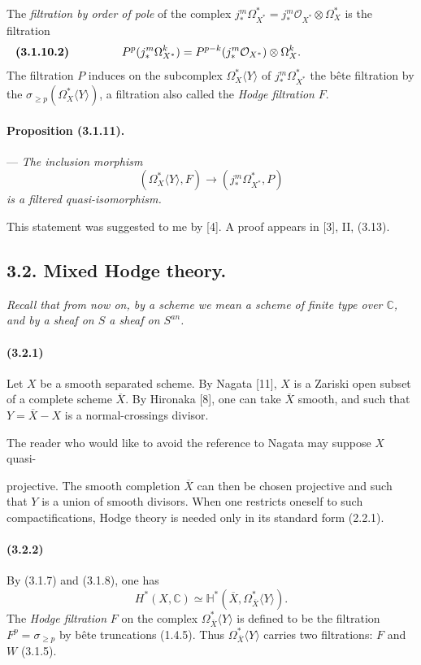 \documentclass[10pt]{article}
\newcommand{\C}{\mathbb C}
\providecommand{\cO}{\mathcal O}
\providecommand{\cO}{\mathcal O}
\begin{document}
The \emph{filtration by order of pole} of the complex $j_*^m\Omega_{X^*}^*=j_*^m\cO_{X^*}\otimes\Omega_X^*$ is the filtration
\[
\makebox[\textwidth][s]{\textbf{(3.1.10.2)}\hfill$\displaystyle P^p(j_*^m\Omega_{X^*}^k)=P^{p-k}(j_*^m\cO_{X^*})\otimes\Omega_X^k.$\hfill\phantom{\textbf{(3.1.10.2)}}}
\]
The filtration $P$ induces on the subcomplex $\Omega_X^*\langle Y\rangle$ of $j_*^m\Omega_{X^*}^*$ the bête filtration by the $\sigma_{\ge p}(\Omega_X^*\langle Y\rangle)$, a filtration also called the \emph{Hodge filtration} $F$.

\paragraph{Proposition (3.1.11).} --- {\itshape The inclusion morphism
\[
(\Omega_X^*\langle Y\rangle,F)\longrightarrow(j_*^m\Omega_{X^*}^*,P)
\]
is a filtered quasi-isomorphism.}

This statement was suggested to me by [4]. A proof appears in [3], II, (3.13).

\subsection*{3.2. Mixed Hodge theory.}

\emph{Recall that from now on, by a scheme we mean a scheme of finite type over $\C$, and by a sheaf on $S$ a sheaf on $S^{an}$.}

\paragraph{(3.2.1)} Let $X$ be a smooth separated scheme. By Nagata [11], $X$ is a Zariski open subset of a complete scheme $\overline X$. By Hironaka [8], one can take $\overline X$ smooth, and such that $Y=\overline X-X$ is a normal-crossings divisor.

The reader who would like to avoid the reference to Nagata may suppose $X$ quasi-



projective. The smooth completion $\overline X$ can then be chosen projective and such that $Y$ is a union of smooth divisors. When one restricts oneself to such compactifications, Hodge theory is needed only in its standard form (2.2.1).

\paragraph{(3.2.2)} By (3.1.7) and (3.1.8), one has
\[
H^*(X,\C)\simeq \mathbb H^*(\overline X,\Omega_{\overline X}^{*}\langle Y\rangle).
\]
The \emph{Hodge filtration} $F$ on the complex $\Omega_{\overline X}^{*}\langle Y\rangle$ is defined to be the filtration $F^p=\sigma_{\ge p}$ by bête truncations (1.4.5). Thus $\Omega_{\overline X}^{*}\langle Y\rangle$ carries two filtrations: $F$ and $W$ (3.1.5).
\end{document}

